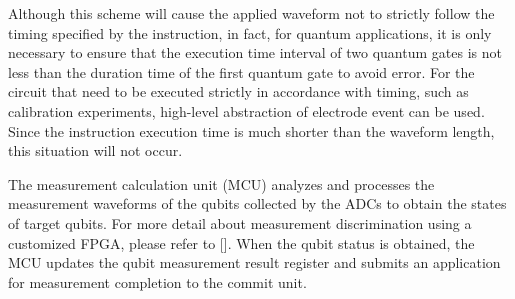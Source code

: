 Although this scheme will cause the applied waveform not to strictly follow the timing specified by the instruction, 
in fact, for quantum applications, it is only necessary to ensure that the execution time interval of two quantum gates is not less than the duration time of the first quantum gate to avoid error.
For the circuit that need to be executed strictly in accordance with timing, 
such as calibration experiments, high-level abstraction of electrode event can be used. 
Since the instruction execution time is much shorter than the waveform length, this situation will not occur.

The measurement calculation unit (MCU) analyzes and processes the measurement waveforms of the qubits collected by the ADCs to obtain the states of target qubits. 
For more detail about measurement discrimination using a customized FPGA, please refer to []. 
When the qubit status is obtained, the MCU updates the qubit measurement result register and submits an application for measurement completion to the commit unit.
